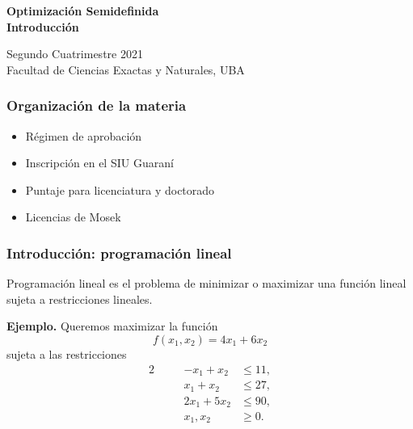\documentclass[aspectratio=169,12pt,spanish]{beamer}
\begin{document}
\begin{frame}

\begin{center}

\Large\textbf{Optimización Semidefinida} \\
\large\textbf{Introducción}




\vspace{1cm}
 Segundo Cuatrimestre 2021
 \\
 {\small Facultad de Ciencias Exactas y Naturales, UBA}
 \end{center}

\end{frame}


\begin{frame}
\frametitle{Organización de la materia}

\begin{itemize}
\item Régimen de aprobación
\item Inscripción en el SIU Guaraní
\item Puntaje para licenciatura y doctorado
\item Licencias de Mosek
\end{itemize}

\end{frame}


\begin{frame}
\frametitle{Introducción: programación lineal}

Programaci\'on lineal es el problema de minimizar o maximizar una funci\'on lineal sujeta a restricciones lineales.

\textbf{Ejemplo.} Queremos maximizar la función
$$f(x_1, x_2) = 4x_1 + 6x_2$$
sujeta a las restricciones
\begin{alignat*}{2}
   & \quad & -x_1 + x_2 &\le 11,\\
   &   \quad & x_1 + x_2 &\le 27, \\
   &   \quad & 2x_1 + 5x_2 &\le 90, \\
   & &  x_1, x_2 &\ge 0.
\end{alignat*}

\end{frame}
\end{document}
